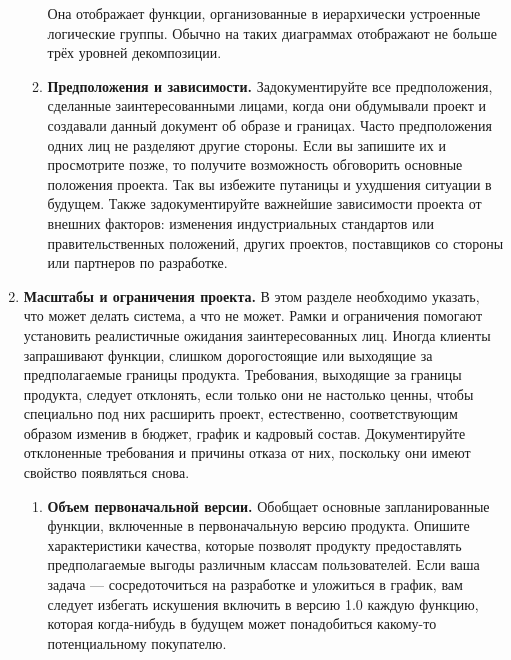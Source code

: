 \documentclass{../../text-style}
\begin{document}
\begin{enumerate}
\begin{enumerate}
        Она отображает функции, организованные в иерархически устроенные логические группы. Обычно на таких диаграммах отображают не больше трёх уровней декомпозиции.
        \item \textbf{Предположения и зависимости.} Задокументируйте все предположения, сделанные заинтересованными лицами, когда они обдумывали проект и создавали данный документ об образе и границах. Часто предположения одних лиц не разделяют другие стороны. Если вы запишите их и просмотрите позже, то получите возможность обговорить основные положения проекта. Так вы избежите путаницы и ухудшения ситуации в будущем. Также задокументируйте важнейшие зависимости проекта от внешних факторов: изменения индустриальных стандартов или правительственных положений, других проектов, поставщиков со стороны или партнеров по разработке.
    \end{enumerate}
    \item \textbf{Масштабы и ограничения проекта.} В этом разделе необходимо указать, что может делать система, а что не может. Рамки и ограничения помогают установить реалистичные ожидания заинтересованных лиц. Иногда клиенты запрашивают функции, слишком дорогостоящие или выходящие за предполагаемые границы продукта. Требования, выходящие за границы продукта, следует отклонять, если только они не настолько ценны, чтобы специально под них расширить проект, естественно, соответствующим образом изменив в бюджет, график и кадровый состав. Документируйте отклоненные требования и причины отказа от них, поскольку они имеют свойство появляться снова.
    \begin{enumerate}
        \item \textbf{Объем первоначальной версии.} Обобщает основные запланированные функции, включенные в первоначальную версию продукта. Опишите характеристики качества, которые позволят продукту предоставлять предполагаемые выгоды различным классам пользователей. Если ваша задача --- сосредоточиться на разработке и уложиться в график, вам следует избегать искушения включить в версию 1.0 каждую функцию, которая когда-нибудь в будущем может понадобиться какому-то потенциальному покупателю.


\end{enumerate}
\end{enumerate}
\end{document}
